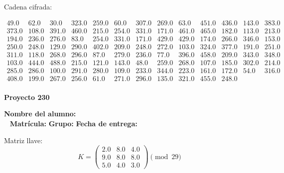\documentclass[12pt]{article}
\begin{document}
Cadena cifrada:
\begin{center}
$\begin{array}{lllllllllllll}
49.0 & 62.0 & 30.0 & 323.0 & 259.0 & 60.0 & 307.0 & 269.0 & 63.0 & 451.0 & 436.0 & 143.0 & 383.0\\
373.0 & 108.0 & 391.0 & 460.0 & 215.0 & 254.0 & 331.0 & 171.0 & 461.0 & 465.0 & 182.0 & 113.0 & 213.0\\
194.0 & 236.0 & 276.0 & 83.0 & 254.0 & 331.0 & 171.0 & 429.0 & 429.0 & 174.0 & 266.0 & 346.0 & 153.0\\
250.0 & 248.0 & 129.0 & 290.0 & 402.0 & 209.0 & 248.0 & 272.0 & 103.0 & 324.0 & 377.0 & 191.0 & 251.0\\
311.0 & 118.0 & 268.0 & 296.0 & 87.0 & 279.0 & 236.0 & 77.0 & 396.0 & 458.0 & 209.0 & 343.0 & 348.0\\
103.0 & 444.0 & 488.0 & 215.0 & 121.0 & 143.0 & 48.0 & 259.0 & 268.0 & 107.0 & 185.0 & 302.0 & 214.0\\
285.0 & 286.0 & 100.0 & 291.0 & 280.0 & 109.0 & 233.0 & 344.0 & 223.0 & 161.0 & 172.0 & 54.0 & 316.0\\
408.0 & 199.0 & 267.0 & 256.0 & 61.0 & 271.0 & 296.0 & 135.0 & 321.0 & 455.0 & 248.0\\
\end{array}$
\end{center}

\newpage


\textbf{Proyecto 230}

\textbf{Nombre del alumno:} \underline{\hspace{13cm}}\\\
\vspace{1cm}
\textbf{Matrícula:} \underline{\hspace{4cm}} \hspace{1cm}
\textbf{Grupo:} \underline{\hspace{2cm}}
\textbf{Fecha de entrega:} \underline{\hspace{2cm}}

\medskip

Matriz llave:
\[
K = \begin{pmatrix}
2.0 & 8.0 & 4.0\\
9.0 & 8.0 & 8.0\\
5.0 & 4.0 & 3.0
\end{pmatrix} \pmod{29}
\]
\end{document}

